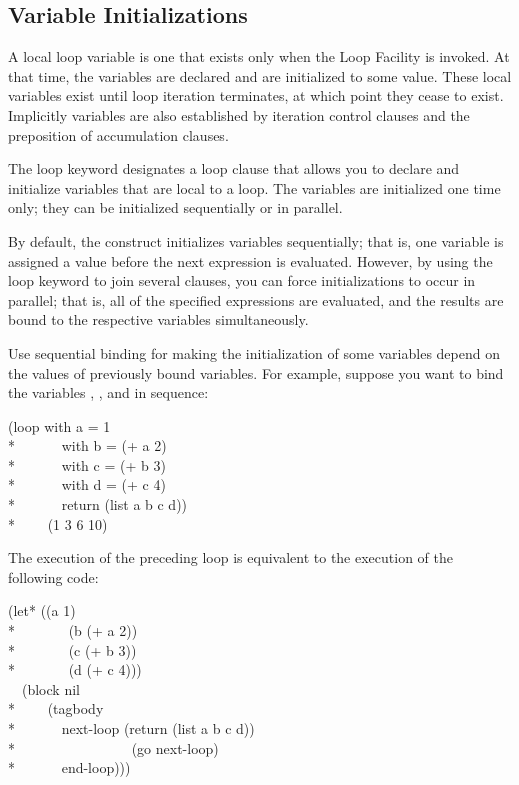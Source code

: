 \begin{new}
\section{Variable Initializations}
\label{LOOP-VAR-SECTION}

A local loop variable is one that exists only when the Loop Facility
is invoked.  At that time, the variables are declared and are
initialized to some value.  These local variables exist until loop
iteration terminates, at which point they cease to exist.  Implicitly
variables are also established by iteration control clauses and the
 preposition of accumulation clauses.


The loop keyword  designates a loop clause that allows you to 
declare and initialize variables
that are local to a loop.  The variables are initialized one time
only; they can be initialized sequentially or in parallel.

By default, the  construct initializes variables
sequentially; that is, one variable is assigned a value before the
next expression is evaluated.  However, by using the loop keyword 
 to join several  clauses, you can force
initializations to occur in parallel; that is, all of the specified
expressions are evaluated, and the results are bound to the respective
variables simultaneously.

Use sequential binding for making the initialization of
some variables depend on the values of previously bound variables.
For example, suppose you want to bind the variables , ,
and  in sequence:
\begin{lisp}
(loop with a = 1  \\*
~~~~~~with b = (+ a 2)  \\*
~~~~~~with c = (+ b 3) \\*
~~~~~~with d = (+ c 4) \\*
~~~~~~return (list a b c d)) \\*
~~~\EV~(1 3 6 10)
\end{lisp}

The execution of the preceding loop is equivalent to the execution of
the following code:
\begin{lisp}
(let* ((a 1) \\*
~~~~~~~(b (+ a 2)) \\*
~~~~~~~(c (+ b 3)) \\*
~~~~~~~(d (+ c 4))) \\
~~(block nil \\*
~~~~(tagbody \\*
~~~~~~next-loop (return (list a b c d)) \\*
~~~~~~~~~~~~~~~~(go next-loop) \\*
~~~~~~end-loop)))
\end{lisp}



\end{new}
